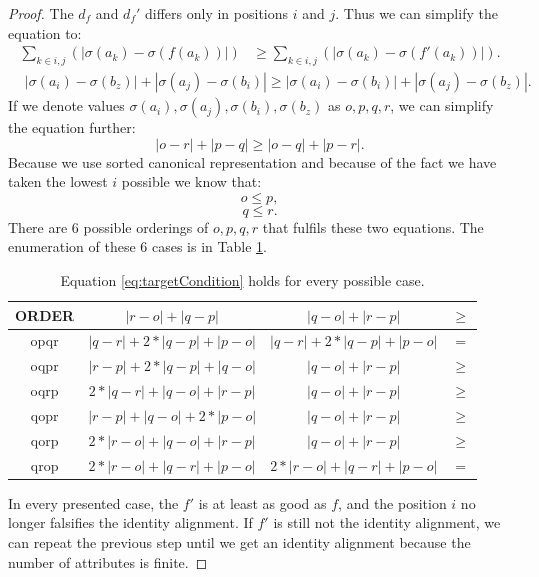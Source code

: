 \begin{proof}
The $d_f$ and $d_f'$ differs only in positions $i$ and $j$. Thus we can simplify the equation to:
\begin{align}
    \sum_{k \in {i,j}}{(|\sigma(a_k)-\sigma(f(a_k))|)} 
    &\geq \sum_{k \in {i,j}}{(|\sigma(a_k)-\sigma(f'(a_k))|)}.  
\end{align}    
\begin{align}    
    &|\sigma(a_i)-\sigma(b_z)|+|\sigma(a_j)-\sigma(b_i)| \geq |\sigma(a_i)-\sigma(b_i)|+|\sigma(a_j)-\sigma(b_z)|. 
\end{align} 
If we denote values $\sigma(a_i),\sigma(a_j),\sigma(b_i),\sigma(b_z)$ as $o,p,q,r$, we can simplify the equation further:
\begin{equation}
|o-r|+|p-q|\geq |o-q|+|p-r|.
\label{eq:targetCondition}
\end{equation}
Because we use sorted canonical representation and because of the fact we have taken the lowest $i$ possible we know that:
\begin{equation}
o\leq p,
\label{eq:op}
\end{equation}
\begin{equation}
q \leq r.
\label{eq:qr}
\end{equation}
There are 6 possible orderings of $o,p,q,r$ that fulfils these two equations. The enumeration of these 6 cases is in Table \ref{table:caseEnum}.

\begin{table}[htbp]
\caption{Equation \ref{eq:targetCondition} holds for every possible case.}
\label{table:caseEnum}
\centering
\begin{tabular}{ |c | c | c |c | }
  \hline
  ORDER & $|r-o|+|q-p|$ & $|q-o|+|r-p|$ & $\geq$ \\
  \hline                       
  opqr & $|q-r|+2*|q-p|+|p-o|$ & $|q-r|+2*|q-p|+|p-o|$ & $=$ \\
  oqpr & $|r-p|+2*|q-p|+|q-o|$ & $|q-o|+|r-p|$ & $\geq$\\
 oqrp & $2*|q-r|+|q-o|+|r-p|$ & $|q-o|+|r-p|$ & $\geq$\\
  qopr & $|r-p|+|q-o|+2*|p-o|$ & $|q-o|+|r-p|$ & $\geq$\\
  qorp & $2*|r-o|+|q-o|+|r-p|$ & $|q-o|+|r-p|$ & $\geq$\\
  qrop & $2*|r-o|+|q-r|+|p-o|$ & $2*|r-o|+|q-r|+|p-o|$ & $=$\\
  \hline  
\end{tabular}
\end{table}
In every presented case, the $f'$ is at least as good as $f$, and the position $i$ no longer falsifies the identity alignment. If $f'$ is still not the identity alignment, we can repeat the previous step until we get an identity alignment because the number of attributes is finite.
\end{proof}

